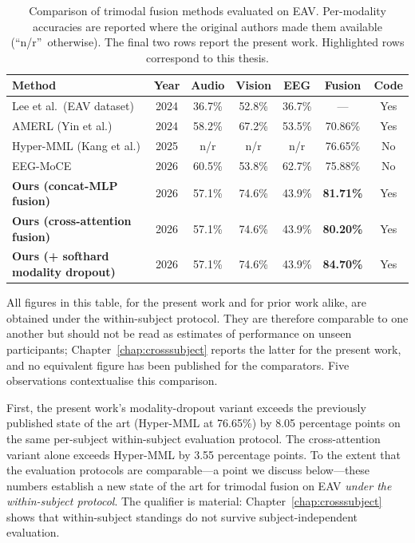 \begin{table}[htbp]
\centering
\caption{Comparison of trimodal fusion methods evaluated on EAV. Per-modality accuracies are reported where the original authors made them available (``n/r''~otherwise). The final two rows report the present work. Highlighted rows correspond to this thesis.}
\label{tab:eav_prior_comparison}
\small
\begin{tabular}{p{4.0cm} c c c c c c}
\hline
\textbf{Method} & \textbf{Year} & \textbf{Audio} & \textbf{Vision} & \textbf{EEG} & \textbf{Fusion} & \textbf{Code} \\
\hline
Lee et al.\ (EAV dataset) \cite{Lee2024EAV}    & 2024 & 36.7\% & 52.8\% & 36.7\% & --- & Yes \\
AMERL (Yin et al.) \cite{Yin2024AMERL}         & 2024 & 58.2\% & 67.2\% & 53.5\% & 70.86\% & Yes \\
Hyper-MML (Kang et al.) \cite{Kang2025HyperMML} & 2025 & n/r & n/r & n/r & 76.65\% & No \\
EEG-MoCE \cite{Anon2026EEGMoCE}                 & 2026 & 60.5\% & 53.8\% & 62.7\% & 75.88\% & No \\
\hline
\textbf{Ours (concat-MLP fusion)}                & 2026 & 57.1\% & 74.6\% & 43.9\% & \textbf{81.71\%} & Yes \\
\textbf{Ours (cross-attention fusion)}          & 2026 & 57.1\% & 74.6\% & 43.9\% & \textbf{80.20\%} & Yes \\
\textbf{Ours (+ softhard modality dropout)}     & 2026 & 57.1\% & 74.6\% & 43.9\% & \textbf{84.70\%} & Yes \\
\hline
\end{tabular}
\end{table}

All figures in this table, for the present work and for prior work alike, are obtained under the within-subject protocol. They are therefore comparable to one another but should not be read as estimates of performance on unseen participants; Chapter~\ref{chap:crosssubject} reports the latter for the present work, and no equivalent figure has been published for the comparators. Five observations contextualise this comparison.

First, the present work's modality-dropout variant exceeds the previously published state of the art (Hyper-MML at 76.65\%) by 8.05 percentage points on the same per-subject within-subject evaluation protocol. The cross-attention variant alone exceeds Hyper-MML by 3.55 percentage points. To the extent that the evaluation protocols are comparable---a point we discuss below---these numbers establish a new state of the art for trimodal fusion on EAV \emph{under the within-subject protocol}. The qualifier is material: Chapter~\ref{chap:crosssubject} shows that within-subject standings do not survive subject-independent evaluation.

